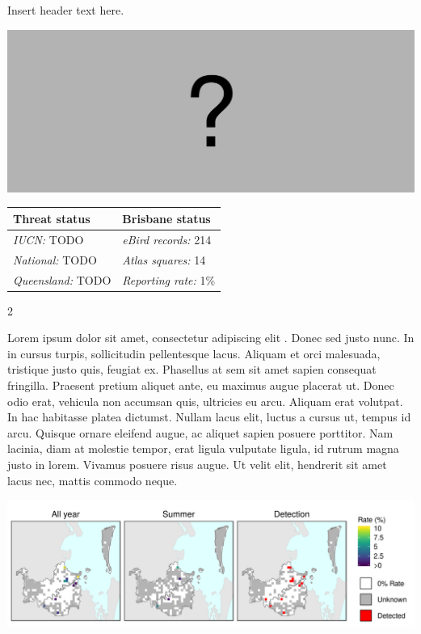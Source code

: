 \documentclass[12pt,openany,oneside]{book}
\let\origfigure\figure
\let\endorigfigure\endfigure
\renewenvironment{figure}[1][2] {
  \expandafter\origfigure\expandafter[H]
} {
  \endorigfigure
}
\let\Begin\begin
\let\End\end
\theoremstyle{definition}
\theoremstyle{definition}
\theoremstyle{definition}
\theoremstyle{remark}
\begin{document}

Insert header text here.

\begin{figure}
\centering
\includegraphics[width=\textwidth,keepaspectratio=true]{assets/misc/missing-profile.png}
\caption{Insert caption here.}
\end{figure}

\begin{tabu} to 
\toprule
Threat status & Brisbane status\\
\midrule
\textit{IUCN:} TODO & \textit{eBird records:} 214\\
\textit{National:} TODO & \textit{Atlas squares:} 14\\
\textit{Queensland:} TODO & \textit{Reporting rate:} 1\%\\
\bottomrule
\end{tabu} 
\vspace{0.15cm}

\Begin{multicols}{2}

Lorem ipsum dolor sit amet, consectetur adipiscing elit
\citep{rexample1, rexample2, rexample3}. Donec sed justo nunc. In in
cursus turpis, sollicitudin pellentesque lacus. Aliquam et orci
malesuada, tristique justo quis, feugiat ex. Phasellus at sem sit amet
sapien consequat fringilla. Praesent pretium aliquet ante, eu maximus
augue placerat ut. Donec odio erat, vehicula non accumsan quis,
ultricies eu arcu. Aliquam erat volutpat. In hac habitasse platea
dictumst. Nullam lacus elit, luctus a cursus ut, tempus id arcu. Quisque
ornare eleifend augue, ac aliquet sapien posuere porttitor. Nam lacinia,
diam at molestie tempor, erat ligula vulputate ligula, id rutrum magna
justo in lorem. Vivamus posuere risus augue. Ut velit elit, hendrerit
sit amet lacus nec, mattis commodo neque.

\End{multicols}

\clearpage

\begin{figure}
\centering
\includegraphics[height=0.47\textheight,width=\textwidth,keepaspectratio=true]{assets/maps/Spatula-rhynchotis.png}
\end{figure}
\end{document}
